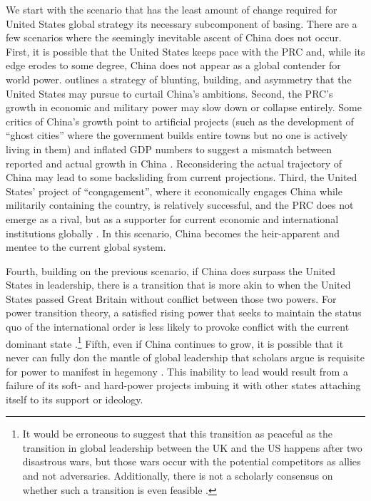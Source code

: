We start with the scenario that has the least amount of change required for United States global strategy its necessary subcomponent of basing. There are a few scenarios where the seemingly inevitable ascent of China does not occur. First, it is possible that the United States keeps pace with the PRC and, while its edge erodes to some degree, China does not appear as a global contender for world power.  outlines a strategy of blunting, building, and asymmetry that the United States may pursue to curtail China's ambitions. Second, the PRC's growth in economic and military power may slow down or collapse entirely. Some critics of China's growth point to artificial projects (such as the development of ``ghost cities'' where the government builds entire towns but no one is actively living in them) and inflated GDP numbers to suggest a mismatch between reported and actual growth in China \cite{Yu2014,Roy2020}. Reconsidering the actual trajectory of China may lead to some backsliding from current projections. Third, the United States' project of ``congagement'', where it economically engages China while militarily containing the country, is relatively successful, and the PRC does not emerge as a rival, but as a supporter for current economic and international institutions globally \cite{Khalilzad1999}. In this scenario, China becomes the heir-apparent and mentee to the current global system. 

Fourth, building on the previous scenario, if China does surpass the United States in leadership, there is a transition that is more akin to when the United States passed Great Britain without conflict between those two powers. For power transition theory, a satisfied rising power that seeks to maintain the status quo of the international order is less likely to provoke conflict with the current dominant state \cite{Organski1980,Efird2003}.\footnote{It would be erroneous to suggest that this transition as peaceful as the transition in global leadership between the UK and the US happens after two disastrous wars, but those wars occur with the potential competitors as allies and not adversaries. Additionally, there is not a scholarly consensus on whether such a transition is even feasible \cite{layne2018}.} Fifth, even if China continues to grow, it is possible that it never can fully don the mantle of global leadership that scholars argue is requisite for power to manifest in hegemony \cite{kindleberger1973}. This inability to lead would result from a failure of its soft- and hard-power projects imbuing it with other states attaching itself to its support or ideology. 


